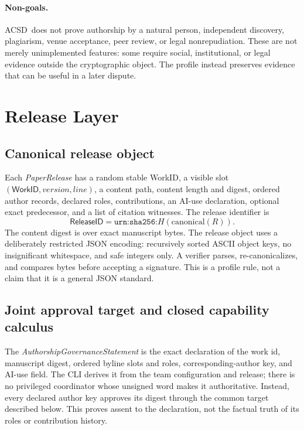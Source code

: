 \documentclass[11pt]{article}
\newcommand{\workid}{\textsf{WorkID}}
\newcommand{\releaseid}{\textsf{ReleaseID}}
\newcommand{\acsd}{\textsc{ACSD}}
\begin{document}
\paragraph{Non-goals.} \acsd\ does not prove authorship by a natural person, independent discovery, plagiarism, venue acceptance, peer review, or legal nonrepudiation. These are not merely unimplemented features: some require social, institutional, or legal evidence outside the cryptographic object. The profile instead preserves evidence that can be useful in a later dispute.

\section{Release Layer}

\subsection{Canonical release object}

Each \emph{PaperRelease} has a random stable \workid, a visible slot $(\workid,\textit{version},\textit{line})$, a content path, content length and digest, ordered author records, declared roles, contributions, an AI-use declaration, optional exact predecessor, and a list of citation witnesses. The release identifier is
\[
  \releaseid = \texttt{urn:sha256:}H(\mathrm{canonical}(R)).
\]
The content digest is over exact manuscript bytes. The release object uses a deliberately restricted JSON encoding: recursively sorted ASCII object keys, no insignificant whitespace, and safe integers only. A verifier parses, re-canonicalizes, and compares bytes before accepting a signature. This is a profile rule, not a claim that it is a general JSON standard.

\subsection{Joint approval target and closed capability calculus}

The \emph{AuthorshipGovernanceStatement} is the exact declaration of the work
id, manuscript digest, ordered byline slots and roles, corresponding-author key,
and AI-use field. The CLI derives it from the team configuration and release;
there is no privileged coordinator whose unsigned word makes it authoritative.
Instead, every declared author key approves its digest through the common
target described below. This proves assent to the declaration, not the factual
truth of its roles or contribution history.
\end{document}
